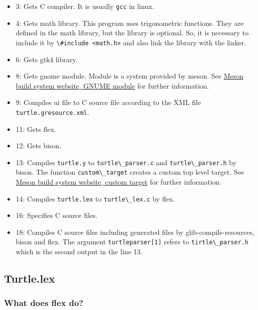 \begin{itemize}
\tightlist
\item
  3: Gets C compiler. It is usually \passthrough{\lstinline!gcc!} in
  linux.
\item
  4: Gets math library. This program uses trigonometric functions. They
  are defined in the math library, but the library is optional. So, it
  is necessary to include it by
  \passthrough{\lstinline!\#include <math.h>!} and also link the library
  with the linker.
\item
  6: Gets gtk4 library.
\item
  8: Gets gnome module. Module is a system provided by meson. See
  \href{https://mesonbuild.com/Gnome-module.html\#gnome-module}{Meson
  build system website, GNUME module} for further information.
\item
  9: Compiles ui file to C source file according to the XML file
  \passthrough{\lstinline!turtle.gresource.xml!}.
\item
  11: Gets flex.
\item
  12: Gets bison.
\item
  13: Compiles \passthrough{\lstinline!turtle.y!} to
  \passthrough{\lstinline!turtle\_parser.c!} and
  \passthrough{\lstinline!turtle\_parser.h!} by bison. The function
  \passthrough{\lstinline!custom\_target!} creates a custom top level
  target. See
  \href{https://mesonbuild.com/Reference-manual.html\#custom_target}{Meson
  build system website, custom target} for further information.
\item
  14: Compiles \passthrough{\lstinline!turtle.lex!} to
  \passthrough{\lstinline!turtle\_lex.c!} by flex.
\item
  16: Specifies C source files.
\item
  18: Compiles C source files including generated files by
  glib-compile-resources, bison and flex. The argument
  \passthrough{\lstinline!turtleparser[1]!} refers to
  \passthrough{\lstinline!tirtle\_parser.h!} which is the second output
  in the line 13.
\end{itemize}

\hypertarget{turtle.lex}{%
\subsection{Turtle.lex}\label{turtle.lex}}

\hypertarget{what-does-flex-do}{%
\subsubsection{What does flex do?}\label{what-does-flex-do}}

